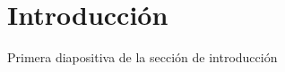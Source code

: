 \section{Introducción}\label{sec:introduccion}
\begin{frame}
    Primera diapositiva de la sección de introducción
\end{frame}